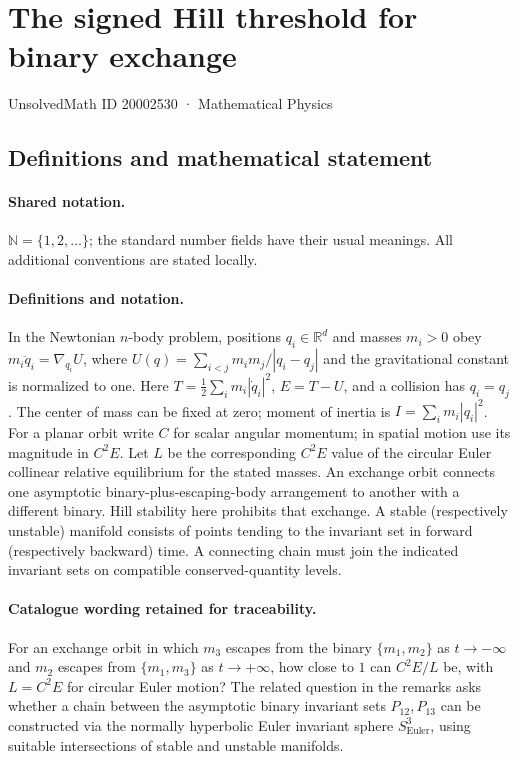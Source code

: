\documentclass[11pt]{article}
\begin{document}
\setcounter{section}{20002529}
\section{The signed Hill threshold for binary exchange}\label{20002530}
{\small UnsolvedMath ID 20002530 · Mathematical Physics}
\subsection{Definitions and mathematical statement}

\paragraph{Shared notation.}$\mathbb N=\{1,2,\ldots\}$; the standard number fields have their usual meanings. All additional conventions are stated locally.


\paragraph{Definitions and notation.}In the Newtonian $n$-body problem, positions $q_i\in\mathbb R^d$ and masses $m_i>0$ obey $m_i\ddot q_i=\nabla_{q_i}U$, where $U(q)=\sum_{i<j}m_im_j/|q_i-q_j|$ and the gravitational constant is normalized to one. Here $T=\tfrac12\sum_i m_i|\dot q_i|^2$, $E=T-U$, and a collision has $q_i=q_j$. The center of mass can be fixed at zero; moment of inertia is $I=\sum_i m_i|q_i|^2$. For a planar orbit write $C$ for scalar angular momentum; in spatial motion use its magnitude in $C^2E$. Let $L$ be the corresponding $C^2E$ value of the circular Euler collinear relative equilibrium for the stated masses. An exchange orbit connects one asymptotic binary-plus-escaping-body arrangement to another with a different binary. Hill stability here prohibits that exchange. A stable (respectively unstable) manifold consists of points tending to the invariant set in forward (respectively backward) time. A connecting chain must join the indicated invariant sets on compatible conserved-quantity levels.

\paragraph{Catalogue wording retained for traceability.}
For an exchange orbit in which $m_3$ escapes from the binary $\{m_1,m_2\}$ as $t\to-\infty$ and $m_2$ escapes from $\{m_1,m_3\}$ as $t\to+\infty$, how close to $1$ can $C^2E/L$ be, with $L=C^2E$ for circular Euler motion? The related question in the remarks asks whether a chain between the asymptotic binary invariant sets $P_{12},P_{13}$ can be constructed via the normally hyperbolic Euler invariant sphere $S^3_{\mathrm{Euler}}$, using suitable intersections of stable and unstable manifolds.
\end{document}
